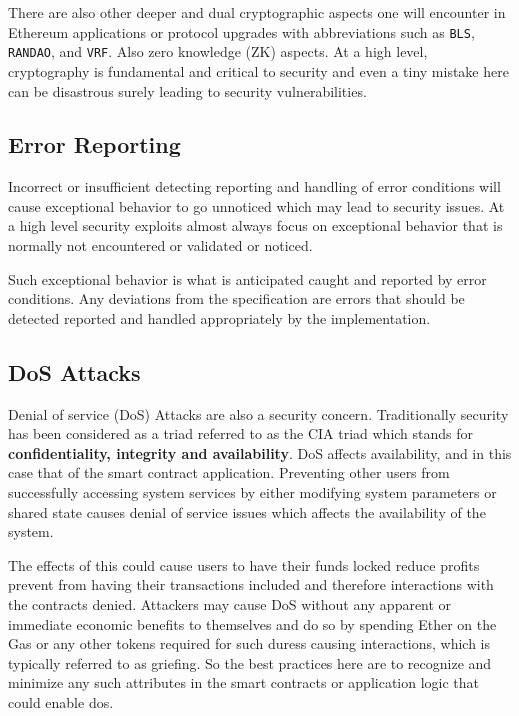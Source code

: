 There are also other deeper and dual cryptographic aspects one will
encounter in Ethereum applications or protocol upgrades with
abbreviations such as \texttt{BLS}, \texttt{RANDAO}, and \texttt{VRF}.
Also zero knowledge (ZK) aspects. At a high level, cryptography is
fundamental and critical to security and even a tiny mistake here can be
disastrous surely leading to security vulnerabilities.

\subsection{Error Reporting}\label{error-reporting}

Incorrect or insufficient detecting reporting and handling of error
conditions will cause exceptional behavior to go unnoticed which may
lead to security issues. At a high level security exploits almost always
focus on exceptional behavior that is normally not encountered or
validated or noticed.

Such exceptional behavior is what is anticipated caught and reported by
error conditions. Any deviations from the specification are errors that
should be detected reported and handled appropriately by the
implementation.

\subsection{DoS Attacks}\label{dos-attacks}

Denial of service (DoS) Attacks are also a security concern.
Traditionally security has been considered as a triad referred to as the
CIA triad which stands for \textbf{confidentiality, integrity and
availability}. DoS affects availability, and in this case that of the
smart contract application. Preventing other users from successfully
accessing system services by either modifying system parameters or
shared state causes denial of service issues which affects the
availability of the system.

The effects of this could cause users to have their funds locked reduce
profits prevent from having their transactions included and therefore
interactions with the contracts denied. Attackers may cause DoS without
any apparent or immediate economic benefits to themselves and do so by
spending Ether on the Gas or any other tokens required for such duress
causing interactions, which is typically referred to as griefing. So the
best practices here are to recognize and minimize any such attributes in
the smart contracts or application logic that could enable dos.

